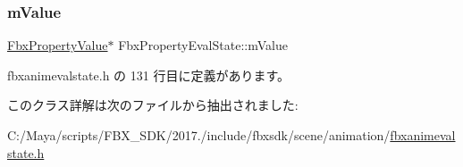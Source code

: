 \subsubsection{\texorpdfstring{m\+Value}{mValue}}
{\footnotesize\ttfamily \hyperlink{class_fbx_property_value}{Fbx\+Property\+Value}$\ast$ Fbx\+Property\+Eval\+State\+::m\+Value}



 fbxanimevalstate.\+h の 131 行目に定義があります。



このクラス詳解は次のファイルから抽出されました\+:\begin{DoxyCompactItemize}
\item 
C\+:/\+Maya/scripts/\+F\+B\+X\+\_\+\+S\+D\+K/2017./include/fbxsdk/scene/animation/\hyperlink{fbxanimevalstate_8h}{fbxanimevalstate.\+h}\end{DoxyCompactItemize}
